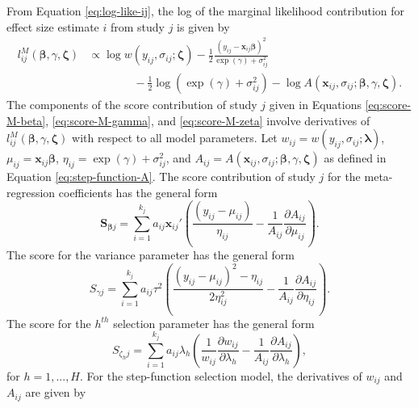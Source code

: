 \documentclass[
  man, donotrepeattitle,floatsintext]{apa7}
\begin{document}
From Equation \eqref{eq:log-like-ij}, the log of the marginal likelihood contribution for effect size estimate \(i\) from study \(j\) is given by
\begin{align}
l^M_{ij}\left(\boldsymbol\beta, \gamma, \boldsymbol\zeta \right) &\propto \log w\left(y_{ij}, \sigma_{ij}; \boldsymbol\zeta \right) - \frac{1}{2} \frac{\left(y_{ij} - \mathbf{x}_{ij} \boldsymbol\beta\right)^2}{\exp(\gamma) + \sigma_{ij}^2} \nonumber \\
& \qquad \qquad  - \frac{1}{2}\log\left(\exp(\gamma) + \sigma_{ij}^2\right) - \log A\left(\mathbf{x}_{ij}, \sigma_{ij}; \boldsymbol\beta, \gamma, \boldsymbol\zeta \right).
\end{align}
The components of the score contribution of study \(j\) given in Equations \eqref{eq:score-M-beta}, \eqref{eq:score-M-gamma}, and \eqref{eq:score-M-zeta} involve derivatives of \(l^M_{ij}\left(\boldsymbol\beta, \gamma, \boldsymbol\zeta \right)\) with respect to all model parameters.
Let \(w_{ij} = w\left(y_{ij}, \sigma_{ij}; \boldsymbol\lambda \right)\), \(\mu_{ij} = \mathbf{x}_{ij} \boldsymbol\beta\), \(\eta_{ij} = \exp(\gamma) + \sigma_{ij}^2\), and \(A_{ij} = A\left(\mathbf{x}_{ij}, \sigma_{ij}; \boldsymbol\beta, \gamma, \boldsymbol\zeta \right)\) as defined in Equation \eqref{eq:step-function-A}.
The score contribution of study \(j\) for the meta-regression coefficients has the general form
\begin{equation}
\mathbf{S}_{\boldsymbol\beta j} = \sum_{i=1}^{k_j}  a_{ij} \mathbf{x}_{ij}' \left(\frac{\left(y_{ij} - \mu_{ij} \right)}{\eta_{ij}} - \frac{1}{A_{ij}}\frac{\partial A_{ij}}{\partial  \mu_{ij}}\right).
\end{equation}
The score for the variance parameter has the general form
\begin{equation}
S_{\gamma j} = \sum_{i=1}^{k_j} a_{ij} \tau^2 \left(\frac{\left(y_{ij} - \mu_{ij}\right)^2 - \eta_{ij}}{2\eta_{ij}^2} - \frac{1}{A_{ij}}\frac{\partial A_{ij}}{\partial \eta_{ij}}\right).
\end{equation}
The score for the \(h^{th}\) selection parameter has the general form
\begin{equation}
S_{\zeta_h j} = \sum_{i=1}^{k_j} a_{ij} \lambda_h \left(\frac{1}{w_{ij}}\frac{\partial w_{ij}}{\partial \lambda_{h}} - \frac{1}{A_{ij}}\frac{\partial A_{ij}}{\partial \lambda_{h}}\right),
\end{equation}
for \(h = 1,...,H\).
For the step-function selection model, the derivatives of \(w_{ij}\) and \(A_{ij}\) are given by
\end{document}
